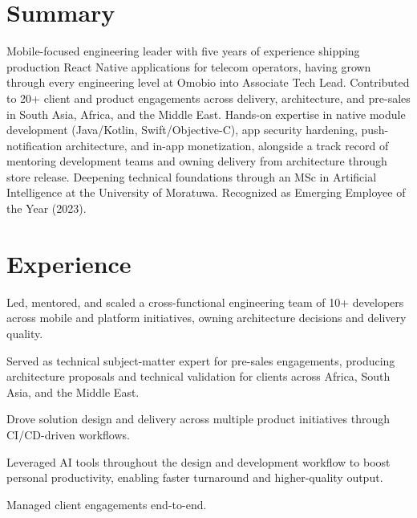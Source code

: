 \documentclass[10.5pt]{article}
\begin{document}

\section*{Summary}
Mobile-focused engineering leader with five years of experience shipping production React Native applications for telecom operators, having grown through every engineering level at Omobio into Associate Tech Lead. Contributed to 20+ client and product engagements across delivery, architecture, and pre-sales in South Asia, Africa, and the Middle East. Hands-on expertise in native module development (Java/Kotlin, Swift/Objective-C), app security hardening, push-notification architecture, and in-app monetization, alongside a track record of mentoring development teams and owning delivery from architecture through store release. Deepening technical foundations through an MSc in Artificial Intelligence at the University of Moratuwa. Recognized as Emerging Employee of the Year (2023).

\section*{Experience}

\begin{cvitems}
  \item Led, mentored, and scaled a cross-functional engineering team of 10+ developers across mobile and platform initiatives, owning architecture decisions and delivery quality.
  \item Served as technical subject-matter expert for pre-sales engagements, producing architecture proposals and technical validation for clients across Africa, South Asia, and the Middle East.
  \item Drove solution design and delivery across multiple product initiatives through CI/CD-driven workflows.
  \item Leveraged AI tools throughout the design and development workflow to boost personal productivity, enabling faster turnaround and higher-quality output.
  \item Managed client engagements end-to-end.
\end{cvitems}
\end{document}
